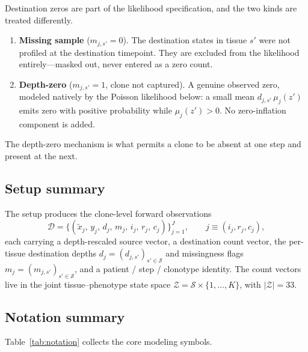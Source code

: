\documentclass[11pt]{article}
\newcommand{\Zsp}{\mathcal{Z}}                    %
\newcommand{\Ssp}{\mathcal{S}}                    %
\newcommand{\Dsp}{\mathcal{D}}                    %
\theoremstyle{definition}
\begin{document}
Destination zeros are part of the likelihood specification, and the two kinds
are treated differently.
\begin{enumerate}[leftmargin=2em, itemsep=3pt]
  \item \textbf{Missing sample} ($m_{j,s'} = 0$). The destination states in
        tissue $s'$ were not profiled at the destination timepoint. They are
        excluded from the likelihood entirely---masked out, never entered as a
        zero count.
  \item \textbf{Depth-zero} ($m_{j,s'} = 1$, clone not captured). A genuine
        observed zero, modeled natively by the Poisson likelihood below: a small
        mean $d_{j,s'}\,\mu_j(z')$ emits zero with positive probability while
        $\mu_j(z') > 0$. No zero-inflation component is added.
\end{enumerate}
The depth-zero mechanism is what permits a clone to be absent at one step and
present at the next.

\subsection{Setup summary}

The setup produces the clone-level forward observations
\[
  \Dsp = \bigl\{ (\tilde{x}_j,\, y_j,\, d_j,\, m_j,\, i_j,\, r_j,\, c_j) \bigr\}_{j=1}^{J},
  \qquad j \equiv (i_j, r_j, c_j),
\]
each carrying a depth-rescaled source vector, a destination count vector, the
per-tissue destination depths $d_j = (d_{j,s'})_{s'\in\Ssp}$ and missingness
flags $m_j = (m_{j,s'})_{s'\in\Ssp}$, and a patient / step / clonotype identity.
The count vectors live in the joint tissue--phenotype state space
$\Zsp = \Ssp \times \{1,\ldots,K\}$, with $|\Zsp| = 33$.

\subsection{Notation summary}

Table~\ref{tab:notation} collects the core modeling symbols.
\end{document}
